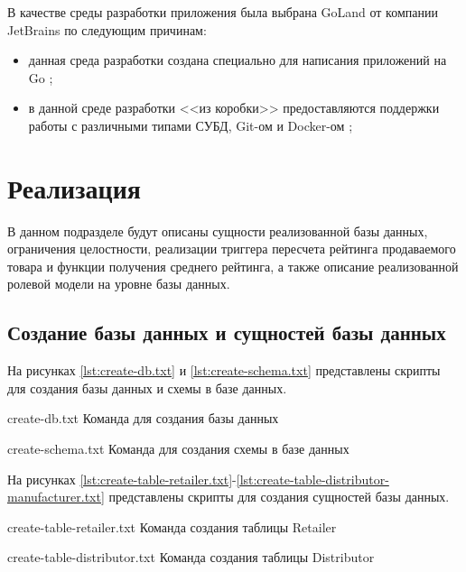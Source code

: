В качестве среды разработки приложения была выбрана GoLand \cite{info_GoLand} от компании JetBrains \cite{info_JetBrains} по следующим причинам: 

\begin{itemize}
	\item данная среда разработки создана специально для написания приложений на Go \cite{info_GoLand_doc};
	\item в данной среде разработки <<из коробки>> предоставляются поддержки работы с различными типами СУБД, Git-ом \cite{info_Git} и Docker-ом \cite{info_Docker};
\end{itemize}

\section{Реализация}

В данном подразделе будут описаны сущности реализованной базы данных, ограничения целостности, реализации триггера пересчета рейтинга продаваемого товара и функции получения среднего рейтинга, а также описание реализованной ролевой модели на уровне базы данных.

\subsection{Создание базы данных и сущностей базы данных}

На рисунках \ref{lst:create-db.txt} и \ref{lst:create-schema.txt} представлены скрипты для создания базы данных и схемы в базе данных.

{create-db.txt} %
{Команда для создания базы данных} %

{create-schema.txt} %
{Команда для создания схемы в базе данных} %

На рисунках \ref{lst:create-table-retailer.txt}-\ref{lst:create-table-distributor-manufacturer.txt} 
представлены скрипты для создания сущностей базы данных.

{create-table-retailer.txt} %
{Команда создания таблицы Retailer} %

{create-table-distributor.txt} %
{Команда создания таблицы Distributor} %

